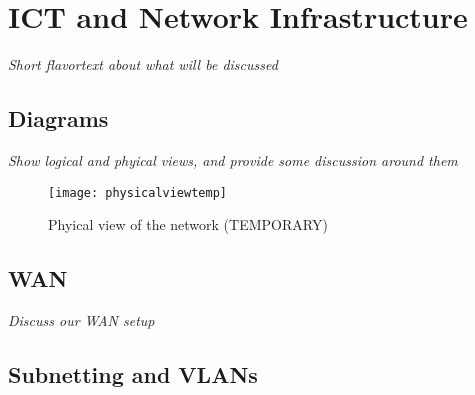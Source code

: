 \section{ICT and Network Infrastructure}

%

\textit{Short flavortext about what will be discussed}


\subsection{Diagrams}

\textit{Show logical and phyical views, and provide some discussion around them}


\begin{figure}[H]
\caption{Phyical view of the network (TEMPORARY)}
\centering
\texttt{[image: physicalviewtemp]}
\label{physicalview}
\end{figure}

\subsection{WAN}

\textit{Discuss our WAN setup}

\subsection{Subnetting and VLANs}

